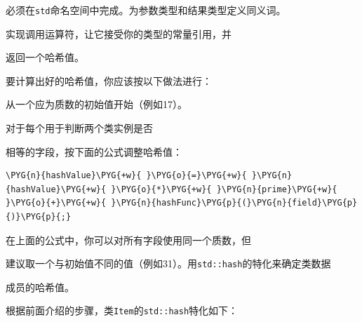 必须在\texttt{std}命名空间中完成。为参数类型和结果类型定义同义词。



实现调用运算符，让它接受你的类型的常量引用，并



返回一个哈希值。



要计算出好的哈希值，你应该按以下做法进行：



从一个应为质数的初始值开始（例如17）。



对于每个用于判断两个类实例是否



相等的字段，按下面的公式调整哈希值：



\begin{codeblockbg}
\begin{Verbatim}[commandchars=\\\{\},breaklines=true,breakanywhere=true,fontsize=\codefont,xleftmargin=17bp]
\PYG{n}{hashValue}\PYG{+w}{ }\PYG{o}{=}\PYG{+w}{ }\PYG{n}{hashValue}\PYG{+w}{ }\PYG{o}{*}\PYG{+w}{ }\PYG{n}{prime}\PYG{+w}{ }\PYG{o}{+}\PYG{+w}{ }\PYG{n}{hashFunc}\PYG{p}{(}\PYG{n}{field}\PYG{p}{)}\PYG{p}{;}
\end{Verbatim}
\end{codeblockbg}



在上面的公式中，你可以对所有字段使用同一个质数，但



建议取一个与初始值不同的值（例如31）。用\texttt{std::\allowbreak{}hash}的特化来确定类数据



成员的哈希值。



根据前面介绍的步骤，类\texttt{Item}的\texttt{std::\allowbreak{}hash}特化如下：



